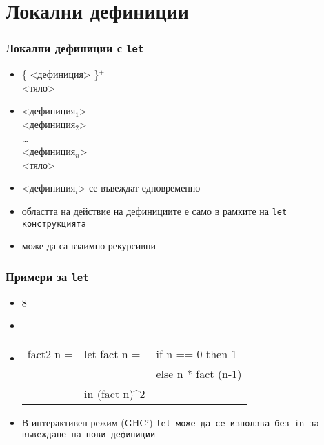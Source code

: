 \documentclass{beamer}
\begin{document}
\section{Локални дефиниции}

\begin{frame}
  \frametitle{Локални дефиниции с \tt{let}}
  \begin{itemize}
  \item {} \{ <дефиниция> \}$^+$\\
     <тяло>
    \pause
  \item {} <дефиниция$_1$>\\
    \hspace{4.5ex}<дефиниция$_2$>\\
    \hspace{4.5ex}\ldots\\
    \hspace{4.5ex}<дефиниция$_n$>\\
     <тяло>
    \pause
  \item{} <дефиниция$_i$> се въвеждат едновременно
  \item областта на действие на дефинициите е само в рамките на \tt{let} конструкцията
  \item може да са взаимно рекурсивни
  \end{itemize}
\end{frame}

\begin{frame}
  \frametitle{Примери за \tt{let}}
  \begin{itemize}[<+->]
  \item {}8
  \item {}
  \item \tt{%
    \begin{tabular}[t]{@{}l@{ }l@{ }l@{}}
      fact2 n = &let fact n = &if n == 0 then 1\\
                &             &else n * fact (n-1)\\
                &in (fact n)\^{}2&
    \end{tabular}}
  \item В интерактивен режим (GHCi) \tt{let} може да се използва без \tt{in} за въвеждане на нови дефиниции
  \end{itemize}
\end{frame}
\end{document}

